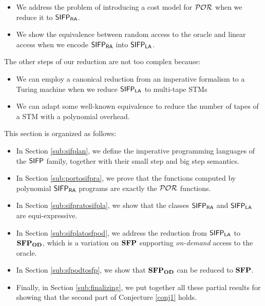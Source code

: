 \begin{itemize}
  \item We address the problem of introducing a
  cost model for $\mathcal{POR}$ when we reduce it to $\mathsf{SIFP_{{\mathsf{RA}}}}$.
  \item We show the equivalence between random access to
  the oracle and linear access when we encode $\mathsf{SIFP_{{\mathsf{RA}}}}$ into $\mathsf{SIFP_{{\mathsf{LA}}}}$.
\end{itemize}

\noindent
The other steps of our reduction are not too complex because:

\begin{itemize}
  \item We can employ a canonical reduction from an imperative formalism to
  a Turing machine when we reduce $\mathsf{SIFP_{{\mathsf{LA}}}}$ to multi-tape STMs
  \item We can adapt some well-known equivalence to reduce the number of tapes
  of a STM with a polynomial overhead.
\end{itemize}

This section is organized as follows:

\begin{itemize}
  \item In Section \ref{sub:sifplan}, we define the imperative programming
  languages of the $\mathsf{SIFP}$ family, together with their small step and big step
  semantics.
  \item In Section \ref{sub:portosifpra}, we prove that the functions computed by
  polynomial $\mathsf{SIFP_{{\mathsf{RA}}}}$ programs are exactly the $\mathcal{POR}$ functions.
  \item In Section \ref{sub:sifpratosifpla}, we show that the classes $\mathsf{SIFP_{{\mathsf{RA}}}}$
  and $\mathsf{SIFP_{{\mathsf{LA}}}}$ are equi-expressive.
  \item In Section \ref{sub:sifplatosfpod}, we address the reduction from $\mathsf{SIFP_{{\mathsf{LA}}}}$
  to $\mathbf{SFP_{\mathbf{OD}}}$, which is a variation on $\mathbf{SFP}$ supporting
  \emph{on-demand} access to the oracle.
  \item In Section \ref{sub:sfpodtosfp}, we show that $\mathbf{SFP_{\mathbf{OD}}}$ can be reduced to $\mathbf{SFP}$.
  \item Finally, in Section \ref{sub:finalizing}, we put together all these partial
  results for showing that the second part of Conjecture \ref{conj1} holds.


\end{itemize}

























